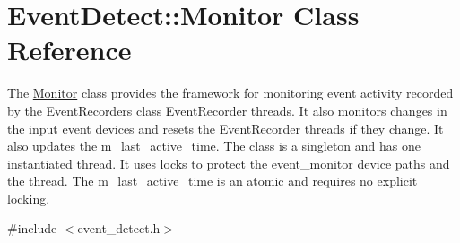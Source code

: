 \hypertarget{classEventDetect_1_1Monitor}{}\section{Event\+Detect\+:\+:Monitor Class Reference}
\label{classEventDetect_1_1Monitor}


The \mbox{\hyperlink{classEventDetect_1_1Monitor}{Monitor}} class provides the framework for monitoring event activity recorded by the Event\+Recorders class Event\+Recorder threads. It also monitors changes in the input event devices and resets the Event\+Recorder threads if they change. It also updates the m\+\_\+last\+\_\+active\+\_\+time. The class is a singleton and has one instantiated thread. It uses locks to protect the event\+\_\+monitor device paths and the thread. The m\+\_\+last\+\_\+active\+\_\+time is an atomic and requires no explicit locking.  




{\ttfamily \#include $<$event\+\_\+detect.\+h$>$}

